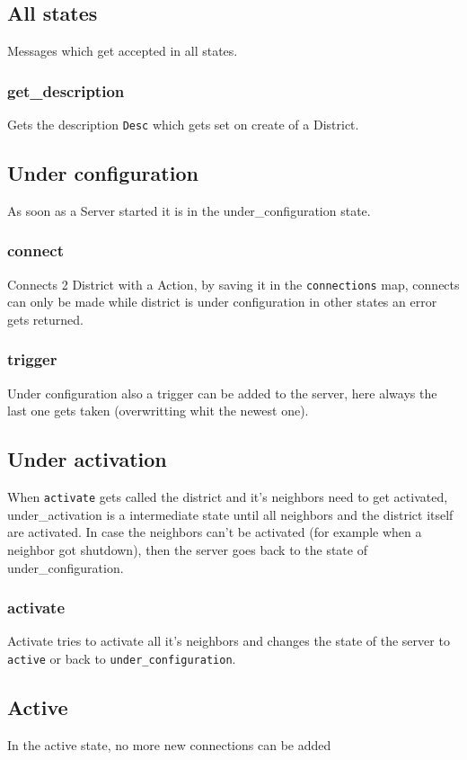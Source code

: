 \documentclass[12pt,a4paper]{article}
\begin{document}
\subsection{All states}
Messages which get accepted in all states.
\subsubsection{get\_description}
Gets the description \texttt{Desc} which gets set on create of a District.

\subsection{Under configuration}
As soon as a Server started it is in the under\_configuration state.
\subsubsection{connect}
Connects 2 District with a Action, by saving it in the \texttt{connections} map, 
connects can only be made while district is under configuration in other states an error gets returned.

\subsubsection{trigger}
Under configuration also a trigger can be added to the server, here always the last one gets taken (overwritting whit the newest one).

\subsection{Under activation}
When \texttt{activate} gets called the district and it's neighbors need to get activated, under\_activation is a intermediate state until all neighbors and the district itself are activated.
In case the neighbors can't be activated (for example when a neighbor got shutdown), then the server goes back to the state of under\_configuration.

\subsubsection{activate}
Activate tries to activate all it's neighbors and changes the state of the server to \texttt{active} or back to \texttt{under\_configuration}.

\subsection{Active}
In the active state, no more new connections can be added 
\end{document}
